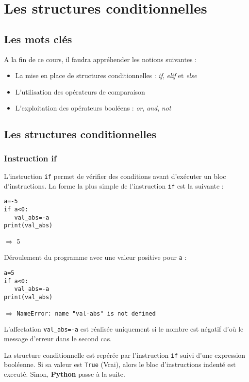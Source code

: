 \chapter{Les structures conditionnelles}
\label{chap:bool}
\section{Les mots clés}
A la fin de ce cours, il faudra appréhender les notions suivantes :
\begin{itemize}
	\item La mise en place de structures conditionnelles : \textit{if}, \textit{elif} et \textit{else}
	\item L'utilisation des opérateurs de comparaison
	\item L'exploitation des opérateurs booléens : \textit{or}, \textit{and}, \textit{not}
\end{itemize}

\section{Les structures conditionnelles}

\subsection{Instruction if}
L'instruction \verb|if| permet de vérifier des conditions avant d'exécuter un bloc d'instructions. La forme la plus simple de l'instruction \verb|if| est la suivante :
\begin{lstlisting}[frame=lines,caption={instruction if},label=abs1]
a=-5
if a<0:
   val_abs=-a
print(val_abs)
\end{lstlisting}
$\Rightarrow$ 5 

Déroulement du programme avec une valeur positive pour  \verb|a| :

\begin{lstlisting}[frame=lines]
a=5
if a<0:
   val_abs=-a
print(val_abs)
\end{lstlisting}
$\Rightarrow$ \texttt{NameError: name "val-abs" is not defined}


L'affectation \verb|val_abs=-a| est réalisée uniquement si le nombre est négatif d'où le message d'erreur dans le second cas.

La structure conditionnelle est repérée par l'instruction \verb|if| suivi d'une expression booléenne. Si sa valeur est \verb|True| (Vrai), alors le bloc d'instructions indenté est executé. Sinon, \textbf{Python} passe à la suite. 

